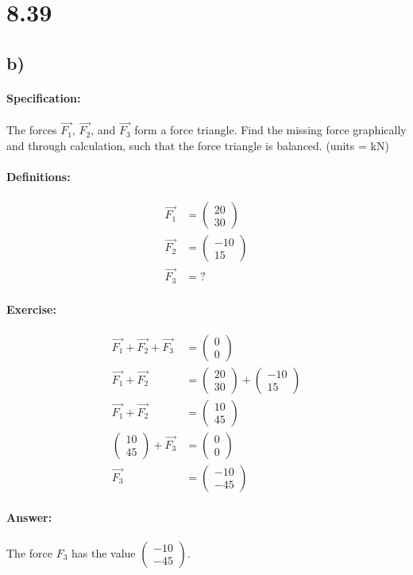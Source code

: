 \section{8.39}
\subsection{b)}

\paragraph{Specification:}
The forces $\vec{F_1}$, $\vec{F_2}$, and $\vec{F_3}$ form a force triangle. Find the missing
force graphically and through calculation, such that the force triangle is balanced. (units = kN)

\def\vFOne{\begin{pmatrix}
    20 \\ 
    30
\end{pmatrix}}
\def\vFTwo{\begin{pmatrix}
    -10 \\
    15
\end{pmatrix}}
\def\vFOnePTwo{\begin{pmatrix}
   10 \\ 
   45
\end{pmatrix}}

\def\vFThree{\begin{pmatrix}
   -10 \\ 
   -45
\end{pmatrix}}

\paragraph{Definitions:}
\begin{align}
   \vec{F_1} &= \vFOne \\ 
   \vec{F_2} &= \vFTwo \\ 
   \vec{F_3} &= ?
\end{align}

\paragraph{Exercise:}
\begin{align}
    \vec{F_1} + \vec{F_2} + \vec{F_3} &= \begin{pmatrix}
        0 \\
        0
    \end{pmatrix} \\
    \vec{F_1} + \vec{F_2} &= \vFOne + \vFTwo \\
    \vec{F_1} + \vec{F_2} &= \vFOnePTwo \\
    \vFOnePTwo + \vec{F_3} &= \begin{pmatrix}
        0 \\
        0
    \end{pmatrix} \\
    \vec{F_3} &= \vFThree
\end{align}

\paragraph{Answer:}
The force $F_3$ has the value $\vFThree$.
